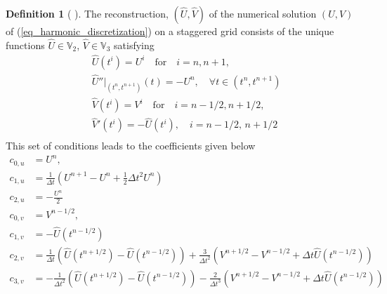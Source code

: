 \documentclass[12pt,a4paper]{article}
\numberwithin{equation}{section}
\theoremstyle{definition}
\newcommand{\qp}[1]{\left(#1\right)}
\newcommand{\rec}[1]{\widehat{{#1}}}
\newtheorem{Defn}[subsection]{Definition}
\begin{document}
\begin{Defn}[ ]\label{defn_our_rec3}
	The reconstruction, $\qp{\rec{U},\rec{V}}$ of the numerical solution $\qp{U,V}$ of (\ref{eq_harmonic_discretization}) on a staggered grid consists of the unique functions $\rec{U}\in \mathbb{V}_2$, $\rec{V}\in\mathbb{V}_3$ satisfying
	\begin{equation}\label{eq_rec3_conds}
	\begin{aligned}
	&\rec{U}\qp{t^i}=U^i \quad \text{for}\quad i= n, n+1,\\
	&\rec{U}''|_{\qp{t^n,t^{n+1}}}\qp{t}=-U^n,\quad\forall t\in\qp{t^n, t^{n+1}}\\
	&\rec{V}\qp{t^i}=V^i \quad \text{for}\quad i= n-1/2, n+1/2,\\
	&\rec{V}'\qp{t^i}=-\rec{U}\qp{t^i},\quad i = n-1/2, \, n+1/2\\
	\end{aligned}
	\end{equation}
	This set of conditions leads to the coefficients given below
	\begin{equation}\label{eq_coeffs_ours}
	\begin{aligned}
	c_{0,u} &= U^{n},\\
	c_{1,u}&=\frac{1}{\Delta t}\qp{U^{n+1}-U^n+\frac{1}{2}\Delta t^2 U^n}\\
	c_{2,u}&=-\frac{U^n}{2}\\%
	c_{0,v} &= V^{n-1/2},\\
	c_{1,v}&=-\rec{U}\qp{t^{n-1/2}}\\
	c_{2,v}&=\frac{1}{\Delta t}\qp{\rec{U}\qp{t^{n+1/2}}-\rec{U}\qp{t^{n-1/2}}}+\frac{3}{\Delta t^2}\qp{V^{n+1/2}-V^{n-1/2}+\Delta t \rec{U}\qp{t^{n-1/2}}}\\
	c_{3,v}&=-\frac{1}{\Delta t^2}\qp{\rec{U}\qp{t^{n+1/2}}-\rec{U}\qp{t^{n-1/2}}}-\frac{2}{\Delta t^3}\qp{V^{n+1/2}-V^{n-1/2}+\Delta t \rec{U}\qp{t^{n-1/2}}} 
	\end{aligned}
	\end{equation}
\end{Defn}
\end{document}
